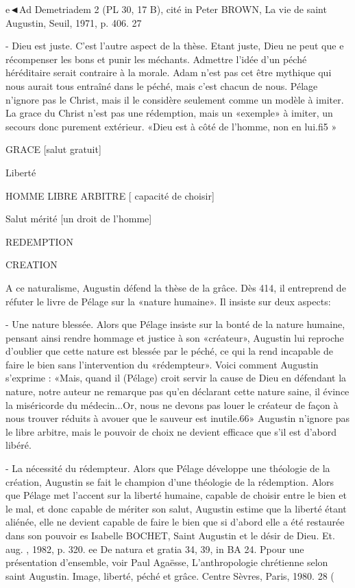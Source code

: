 e◄Ad Demetriadem 2 (PL 30, 17 B), cité in Peter BROWN, La vie de saint Augustin, Seuil, 1971, p.
406.
27
 
- Dieu est	juste. C'est l'autre aspect de la thèse. Etant juste, Dieu ne peut que	e
récompenser les bons et punir les méchants. Admettre l'idée d'un péché héréditaire
serait contraire à la morale. Adam n'est pas cet être mythique qui nous aurait tous entraîné dans le péché, mais c'est chacun de nous. Pélage n'ignore pas le Christ, mais il le considère seulement comme un modèle à imiter. La grace du Christ n'est pas une rédemption, mais un «exemple» à imiter,  un secours donc purement extérieur.
«Dieu est à côté de l'homme, non en lui.fi5 »

 
GRACE
[salut	gratuit]


Liberté

HOMME
LIBRE	ARBITRE
[ capacité de choisir]





Salut	mérité [un droit de l'homme]
 



REDEMPTION





CREATION
 


A ce naturalisme, Augustin défend la thèse de la grâce. Dès 414, il entreprend de réfuter le livre de Pélage sur la «nature humaine». Il insiste sur deux aspects:

-	Une		nature	blessée.	Alors que Pélage insiste sur la bonté de la nature humaine, pensant ainsi rendre hommage et justice à son «créateur», Augustin lui reproche d'oublier que cette nature est blessée par le péché, ce qui la rend incapable de faire le bien sans l'intervention du «rédempteur».		Voici comment Augustin s'exprime :	«Mais, quand il (Pélage) croit servir la cause de Dieu en défendant la nature, notre auteur ne remarque pas qu'en déclarant cette nature saine, il évince la miséricorde du médecin...Or, nous ne devons pas louer le créateur de façon à nous trouver réduits à avouer que le sauveur est inutile.66»	Augustin n'ignore pas le libre arbitre, mais le pouvoir de choix ne devient efficace que s'il est d'abord libéré.

-	La nécessité du rédempteur. Alors que Pélage développe une théologie de la création, Augustin se fait le champion d'une théologie de la rédemption. Alors que Pélage met l'accent sur la liberté humaine, capable de choisir entre le bien et le mal, et donc capable de mériter son salut, Augustin estime que la liberté étant aliénée, elle ne devient capable de faire le bien que si d'abord elle a été restaurée dans son pouvoir
es Isabelle BOCHET, Saint Augustin et le désir de Dieu. Et. aug. , 1982, p. 320.
ee De natura et gratia 34, 39, in BA 24. Ppour une présentation d'ensemble, voir Paul Agaësse, L'anthropologie chrétienne selon saint Augustin. Image, liberté, péché et grâce. Centre Sèvres, Paris, 1980.
28	(
 
